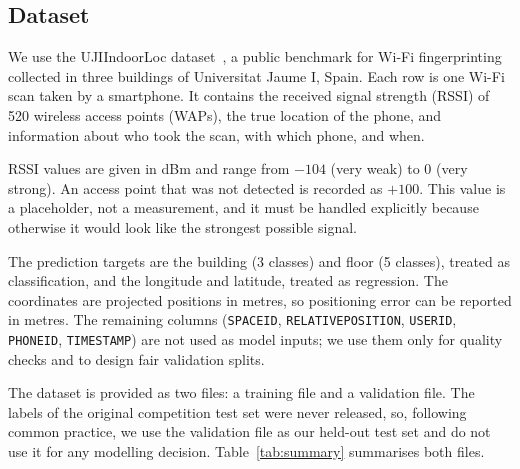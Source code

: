 
\subsection{Dataset}

We use the UJIIndoorLoc dataset~\cite{torres2014ujiindoorloc, uci_ujiindoorloc}, a public benchmark for
Wi-Fi fingerprinting collected in three buildings of Universitat Jaume I, Spain. Each row is one Wi-Fi
scan taken by a smartphone. It contains the received signal strength (RSSI) of 520 wireless access
points (WAPs), the true location of the phone, and information about who took the scan, with which
phone, and when.

RSSI values are given in dBm and range from $-104$ (very weak) to $0$ (very strong). An access point
that was not detected is recorded as $+100$. This value is a placeholder, not a measurement, and it
must be handled explicitly because otherwise it would look like the strongest possible signal.

The prediction targets are the building (3 classes) and floor (5 classes), treated as classification,
and the longitude and latitude, treated as regression. The coordinates are projected positions in
metres, so positioning error can be reported in metres. The remaining columns (\texttt{SPACEID},
\texttt{RELATIVEPOSITION}, \texttt{USERID}, \texttt{PHONEID}, \texttt{TIMESTAMP}) are not used as model
inputs; we use them only for quality checks and to design fair validation splits.

The dataset is provided as two files: a training file and a validation file. The labels of the original
competition test set were never released, so, following common practice, we use the validation file
as our held-out test set and do not use it for any modelling decision. Table~\ref{tab:summary}
summarises both files.

